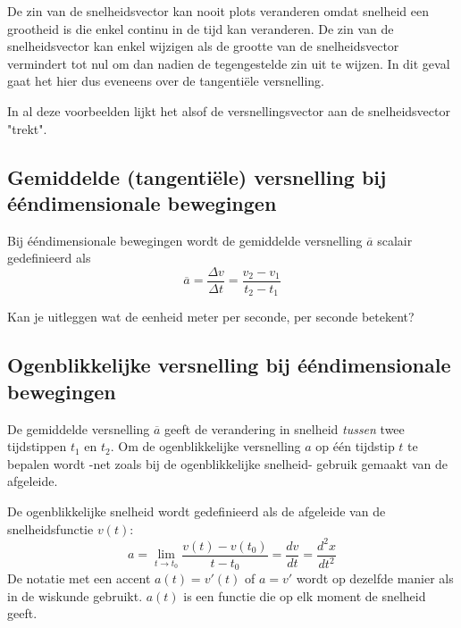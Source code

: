 \documentclass{ximera}
\begin{document}
\begin{remark}
De zin van de snelheidsvector kan nooit plots veranderen omdat snelheid een grootheid is die enkel continu in de tijd kan veranderen. De zin van de snelheidsvector kan enkel wijzigen als de grootte van de snelheidsvector vermindert tot nul om dan nadien de tegengestelde zin uit te wijzen. In dit geval gaat het hier dus eveneens over de tangentiële versnelling.
\end{remark}


In al deze voorbeelden lijkt het alsof de versnellingsvector aan de snelheidsvector "trekt".

\subsection*{Gemiddelde (tangentiële) versnelling bij ééndimensionale bewegingen}

\begin{definition}

Bij ééndimensionale bewegingen wordt de gemiddelde versnelling \(\overline{a}\) scalair gedefinieerd als
\[
\overline{a}=\frac{\Delta v}{\Delta t}=\frac{v_2-v_1}{t_2-t_1}
\]
\end{definition}

\begin{denkvraag*}{}
Kan je uitleggen wat de eenheid meter per seconde, per seconde betekent? 
\end{denkvraag*}

\subsection*{Ogenblikkelijke versnelling bij ééndimensionale bewegingen}

De gemiddelde versnelling \(\overline{a}\) geeft de verandering in snelheid \textit{tussen} twee tijdstippen \(t_1\) en \(t_2\).  Om de ogenblikkelijke versnelling \(a\) op één tijdstip \(t\) te bepalen wordt -net zoals bij de ogenblikkelijke snelheid- gebruik gemaakt van de afgeleide. 

\begin{definition}
De ogenblikkelijke snelheid wordt gedefinieerd als de afgeleide van de snelheidsfunctie \(v(t)\):
\[
a=\lim_{t\to t_0}\frac{v(t)-v(t_0)}{t-t_0} = \frac{dv}{dt}=\frac{d^2x}{dt^2}
\]
De notatie met een accent $a(t)=v'(t)$ of $a=v'$ wordt op dezelfde manier als in de wiskunde gebruikt. $a(t)$ is een functie die op elk moment de snelheid geeft. 
\end{definition}
\end{document}
